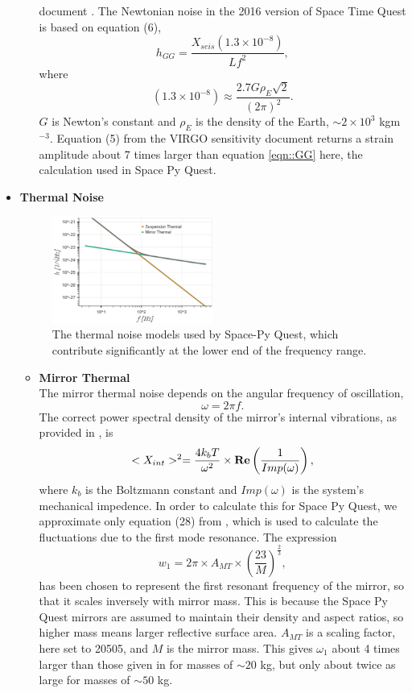 \documentclass{article}
\begin{document}
\begin{itemize}
\begin{itemize}
    document \cite{VIRGO}. The Newtonian noise in the 2016 version of
    Space Time Quest is based on equation (6),
    \begin{equation}
    \label{eqn::GG}
    h_{GG} = \frac{X_{seis}(1.3\times10^{-8})}{Lf^2},
    \end{equation}
    where
    \[
    (1.3\times10^{-8}) \approx \frac{2.7G\rho_E\sqrt{2}}{(2\pi)^2}.
    \]
   $G$ is Newton's constant and $\rho_E$ is the density of the Earth,
   $\sim 2 \times 10^3$ kgm$^{-3}$. Equation (5) from the VIRGO
   sensitivity document returns a strain amplitude about 7 times
   larger than equation \ref{eqn::GG} here, the calculation used in
   Space Py Quest.
   \end{itemize}
   \item \textbf{Thermal Noise} \\
    \begin{figure}[h!]
    \centering
    \includegraphics[width=0.5\textwidth]{SPQ_aLIGO_thermal.pdf}
    \caption{The thermal noise models used by Space-Py Quest, which contribute significantly at the lower end of the frequency range.}
    \label{fig:thermal}
    \end{figure}
    \begin{itemize}
    \item \textbf{Mirror Thermal} \\
    The mirror thermal noise depends on the angular frequency of oscillation,
    \[
    \omega = 2\pi f.
    \]
     The correct power spectral density of the mirror's internal vibrations, as provided in \cite{VIRGO}, is
    \[
    <X_{int}>^2 = \frac{4k_bT}{\omega^2} \times\text{\textbf{Re}}\left(\frac{1}{Imp(\omega)}\right),
    \]
    where $k_b$ is the Boltzmann constant and $Imp(\omega)$ is the
    system's mechanical impedence. In order to calculate this for
    Space Py Quest, we  approximate only equation (28) from
    \cite{VIRGO}, which is used to calculate the fluctuations due to
    the first mode resonance. The expression
    \[
    w_1 = 2\pi \times A_{MT} \times \left(\frac{23}{M}\right)^{\frac{2}{3}}, 
    \]
    has been chosen to represent the first resonant frequency of the
    mirror, so that it scales inversely with mirror mass. This is
    because the Space Py Quest mirrors are assumed to maintain their
    density and aspect ratios, so higher mass means larger reflective
    surface area. $A_{MT}$ is a scaling factor, here set to 20505, and
    $M$ is the mirror mass. This gives $\omega_1$ about 4 times larger
    than those given in \cite{VIRGO} for masses of $\sim 20$ kg, but
    only about twice as large for masses of $\sim 50$ kg. 


\end{itemize}
\end{itemize}
\end{document}
